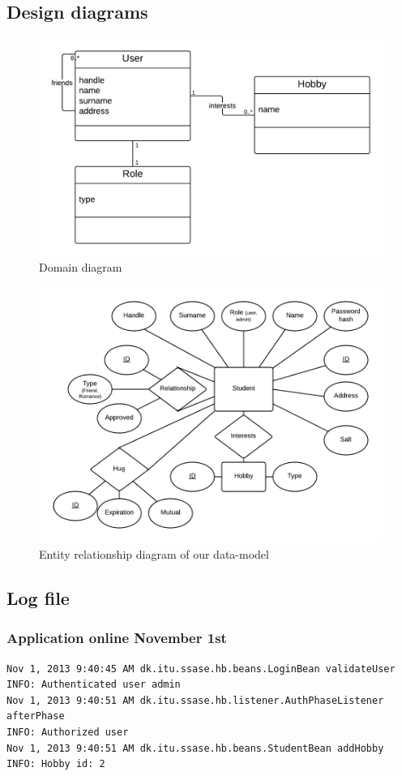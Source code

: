 \documentclass[a4paper]{article}
\begin{document}
\subsection{Design diagrams}
\begin{figure}[h!]
\centering
\includegraphics[scale=0.3]{Domain}
\caption{Domain diagram}
\label{fig:domain_diagram}
\end{figure}
\begin{figure}[h!]
\centering
\includegraphics[scale=0.4]{ER}
\caption{Entity relationship diagram of our data-model}
\label{fig:er_diagram}
\end{figure}

\newpage
\subsection{Log file}
\subsubsection{Application online November 1st \label{sec:appendix:online}}
\begin{verbatim}
Nov 1, 2013 9:40:45 AM dk.itu.ssase.hb.beans.LoginBean validateUser
INFO: Authenticated user admin
Nov 1, 2013 9:40:51 AM dk.itu.ssase.hb.listener.AuthPhaseListener afterPhase
INFO: Authorized user
Nov 1, 2013 9:40:51 AM dk.itu.ssase.hb.beans.StudentBean addHobby
INFO: Hobby id: 2
\end{verbatim}
\end{document}
